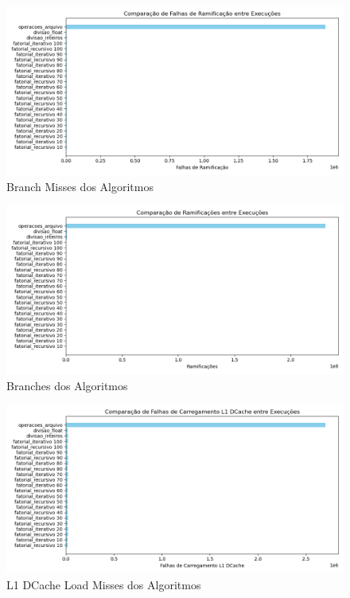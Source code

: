 \documentclass[12pt]{article}
\begin{document}
\begin{figure}[H]
    \centering
    \includegraphics[width=\linewidth]{resultados/branch_misses.png}
    \caption{Branch Misses dos Algoritmos}
    \label{fig:branch_misses}
\end{figure}

\begin{figure}[H]
    \centering
    \includegraphics[width=\linewidth]{resultados/branches.png}
    \caption{Branches dos Algoritmos}
    \label{fig:branches}
\end{figure}

\begin{figure}[H]
    \centering
    \includegraphics[width=\linewidth]{resultados/l1_dcache_load_misses.png}
    \caption{L1 DCache Load Misses dos Algoritmos}
    \label{fig:l1_dcache_load_misses}
\end{figure}
\end{document}

